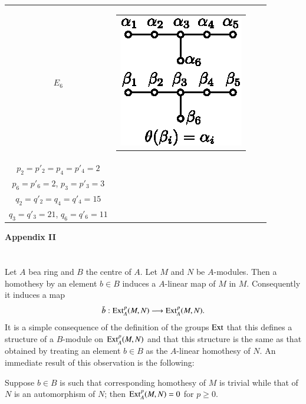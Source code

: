 {\begin{longtable}{@{}|c|c|l|l|@{}}
$E_6$ & 
\begin{tabular}{c}
{\includegraphics[scale=0.8]{318g.eps}}
\end{tabular}&
\begin{tabular}{l}
$p_1 = p'_1 = p_5 = p'_5 = 1$,\\
$p_2 = p'_2 = p_4 = p'_4 = 2$\\
$p_6 = p'_6 = 2$, $p_3 = p'_3 = 3$
\end{tabular} & 
\begin{tabular}{l}
$q_1 = q'_1 = q_5 = q'_5 = 16$,\\
$q_2 = q'_2 = q_4 = q'_4 = 15$\\
$q_3 = q'_3 = 21$, $q_6 = q'_6 = 11$
\end{tabular}\\\hline
\end{longtable}\pageoriginale}\relax

\begin{center}
{\textbf{\Large{Appendix II}}}
\end{center}

\section{}%
Let $A$ be\pageoriginale a ring and $B$ the centre of $A$. Let $M$ and $N$ be $A$-modules. Then a homothesy by an element $b \in B$ induces a $A$-linear map of $M$ in $M$. Consequently it induces a map
$$
\bar{b} : \operatorname{Ext}^p_A (M,N) \longrightarrow \operatorname{Ext}^p_A (M,N).
$$
It is a simple consequence of the definition of the groups $\operatorname{Ext}$ that this defines a structure of a $B$-module on $\operatorname{Ext}^p_A (M,N)$ and that this structure is the same as that obtained by treating an element $b \in B$ as the $A$-linear homothesy of $N$. An immediate result of this observation is the following:

\setcounter{appenprop}{7}
\begin{appenprop}\label{art9-appenpropA8}
Suppose $b \in B$ is such that corresponding homothesy of $M$ is trivial while that of $N$ is an automorphism of $N$; then $\operatorname{Ext}^p_A (M,N) = 0$ for $p \geqslant 0$.
\end{appenprop}

